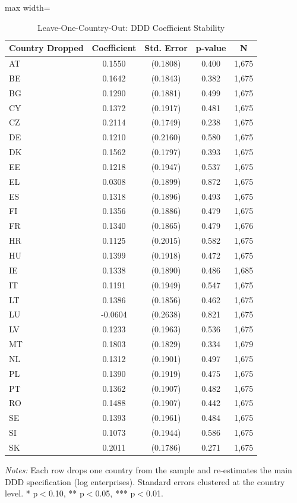 \begin{table}[H]
\centering
\caption{Leave-One-Country-Out: DDD Coefficient Stability}
\label{tab:loo}

\begin{adjustbox}{max width=\textwidth}\begin{tabular}{lcccc}
\toprule
Country Dropped & Coefficient & Std. Error & p-value & N \\
\midrule
AT & 0.1550 & (0.1808) & 0.400 & 1,675 \\
BE & 0.1642 & (0.1843) & 0.382 & 1,675 \\
BG & 0.1290 & (0.1881) & 0.499 & 1,675 \\
CY & 0.1372 & (0.1917) & 0.481 & 1,675 \\
CZ & 0.2114 & (0.1749) & 0.238 & 1,675 \\
DE & 0.1210 & (0.2160) & 0.580 & 1,675 \\
DK & 0.1562 & (0.1797) & 0.393 & 1,675 \\
EE & 0.1218 & (0.1947) & 0.537 & 1,675 \\
EL & 0.0308 & (0.1899) & 0.872 & 1,675 \\
ES & 0.1318 & (0.1896) & 0.493 & 1,675 \\
FI & 0.1356 & (0.1886) & 0.479 & 1,675 \\
FR & 0.1340 & (0.1865) & 0.479 & 1,676 \\
HR & 0.1125 & (0.2015) & 0.582 & 1,675 \\
HU & 0.1399 & (0.1918) & 0.472 & 1,675 \\
IE & 0.1338 & (0.1890) & 0.486 & 1,685 \\
IT & 0.1191 & (0.1949) & 0.547 & 1,675 \\
LT & 0.1386 & (0.1856) & 0.462 & 1,675 \\
LU & -0.0604 & (0.2638) & 0.821 & 1,675 \\
LV & 0.1233 & (0.1963) & 0.536 & 1,675 \\
MT & 0.1803 & (0.1829) & 0.334 & 1,679 \\
NL & 0.1312 & (0.1901) & 0.497 & 1,675 \\
PL & 0.1390 & (0.1919) & 0.475 & 1,675 \\
PT & 0.1362 & (0.1907) & 0.482 & 1,675 \\
RO & 0.1488 & (0.1907) & 0.442 & 1,675 \\
SE & 0.1393 & (0.1961) & 0.484 & 1,675 \\
SI & 0.1073 & (0.1944) & 0.586 & 1,675 \\
SK & 0.2011 & (0.1786) & 0.271 & 1,675 \\
\bottomrule
\end{tabular}\end{adjustbox}
\par\vspace{0.3em}

\textit{Notes:} Each row drops one country from the sample and re-estimates the main DDD specification (log enterprises). Standard errors clustered at the country level. * p$<$0.10, ** p$<$0.05, *** p$<$0.01.


\end{table}

